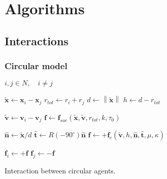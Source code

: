 \documentclass[]{article}
\begin{document}
\section{Algorithms}


\renewcommand{\algorithmiccomment}[1]{{\hspace{1.0 em}\color{gray}\textit{// #1}}}  %


\subsection{Interactions}
\subsubsection{Circular model}
\begin{algorithm}[H]
\begin{algorithmic}[1]  %
\REQUIRE $ i,j \in N, \quad i \neq j $
\ENSURE

\STATE $ \tilde{\mathbf{x}} \gets \mathbf{x}_{i} - \mathbf{x}_{j} $
\STATE $ r_{tot} \gets r_{i} + r_{j} $ 
\STATE $ d \gets \left\|\tilde{\mathbf{x}}\right\| $
\STATE $ h \gets d - r_{tot} $
\STATE

\STATE $ \tilde{\mathbf{v}} \gets \mathbf{v}_{i} - \mathbf{v}_{j} $
\STATE $ \mathbf{f} \gets \mathbf{f}_{soc}(\tilde{\mathbf{x}}, \tilde{\mathbf{v}}, r_{tot}, k, \tau_{0}) $

\STATE

\STATE $ \hat{\mathbf{n}} \gets \tilde{\mathbf{x}} / d $
\STATE $ \hat{\mathbf{t}} \gets R(-90^{\circ}) \hat{\mathbf{n}} $
\STATE $ \mathbf{f} \gets +\mathbf{f}_{c}(\tilde{\mathbf{v}}, h, \hat{\mathbf{n}}, \hat{\mathbf{t}}, \mu, \kappa) $
\ENDIF

\STATE
\STATE $ \mathbf{f}_{i} \gets +\mathbf{f} $
\STATE $ \mathbf{f}_{j} \gets -\mathbf{f} $
\ENDIF
\end{algorithmic}
\caption{Interaction between circular agents.}
\end{algorithm}
\end{document}
